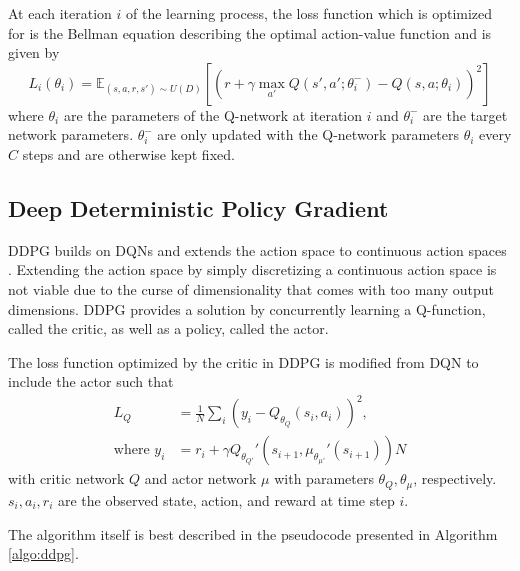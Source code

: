 At each iteration $i$ of the learning process, the loss function which is optimized for is the Bellman equation describing the optimal action-value function and is given by
\begin{equation}
	L_i(\theta_i) = \mathbb{E}_{(s,a,r,s') \sim U(D)} \left[\left(
		r + \gamma \underset{a'}{\max}Q(s', a'; \theta_i^-) - Q(s,a; \theta_i)
	\right)^2\right]
\end{equation}
where $\theta_i$ are the parameters of the Q-network at iteration $i$ and $\theta_i^-$ are the target network parameters.
$\theta_i^-$ are only updated with the Q-network parameters $\theta_i$ every $C$ steps and are otherwise kept fixed.


\subsection{Deep Deterministic Policy Gradient}\label{subsec:background-ddpg}

DDPG builds on DQNs and extends the action space to continuous action spaces \cite{lillicrap2015continuous}.
Extending the action space by simply discretizing a continuous action space is not viable due to the curse of dimensionality that comes with too many output dimensions.
DDPG provides a solution by concurrently learning a Q-function, called the critic, as well as a policy, called the actor.

The loss function optimized by the critic in DDPG is modified from DQN to include the actor such that
\begin{align}
	L_Q &= \frac{1}{N}\sum_{i} \left(
		y_i - Q_{\theta_Q}(s_i, a_i)
	\right)^2, \label{eq:ddpg-lq}\\
	\text{where }y_i &= r_i + \gamma Q_{\theta_{Q'}}'(s_{i+1}, \mu_{\theta_{\mu'}}'(s_{i+1})) \label{eq:ddpg-y}
N\end{align}
with critic network $Q$ and actor network $\mu$ with parameters $\theta_Q, \theta_\mu$, respectively.
$s_i, a_i, r_i$ are the observed state, action, and reward at time step $i$.

The algorithm itself is best described in the pseudocode presented in Algorithm \ref{algo:ddpg}.

